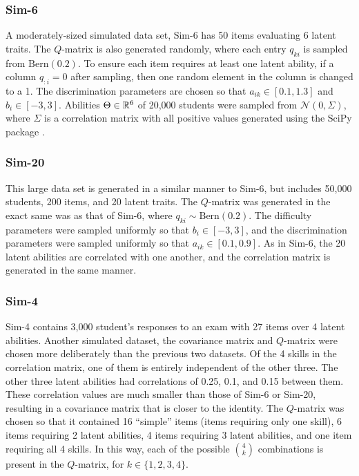 \subsubsection*{Sim-6} A moderately-sized simulated data set, Sim-6 has 50 items evaluating 6 latent traits. The $Q$-matrix is also generated randomly, where each entry $q_{ki}$ is sampled from $\text{Bern}(0.2)$. To ensure each item requires at least one latent ability, if a column $q_{:i} = 0$ after sampling, then one random element in the column is changed to a 1. The discrimination parameters are chosen so that $a_{ik} \in [0.1, 1.3]$ and $b_i \in[-3,3]$. Abilities $\Theta \in \mathbb{R}^6$ of 20,000 students were sampled from $\mathcal{N}(0, \Sigma)$, where $\Sigma$ is a correlation matrix with all positive values generated using the SciPy package \cite{SciPy}.

\subsubsection*{Sim-20} This large data set is generated in a similar manner to Sim-6, but includes 50,000 students, 200 items, and 20 latent traits. The $Q$-matrix was generated in the exact same was as that of Sim-6, where $q_{ki} \sim \text{Bern}(0.2)$. The difficulty parameters were sampled uniformly so that $b_i \in [-3,3]$, and the discrimination parameters were sampled uniformly so that $a_{ik} \in [0.1, 0.9]$. As in Sim-6, the 20 latent abilities are correlated with one another, and the correlation matrix is generated in the same manner.
\subsubsection*{Sim-4} Sim-4 contains 3,000 student's responses to an exam with 27 items over 4 latent abilities. Another simulated dataset, the covariance matrix and $Q$-matrix were chosen more deliberately than the previous two datasets. Of the 4 skills in the correlation matrix, one of them is entirely independent of the other three. The other three latent abilities had correlations of 0.25, 0.1, and 0.15 between them. These correlation values are much smaller than those of Sim-6 or Sim-20, resulting in a covariance matrix that is closer to the identity. The $Q$-matrix was chosen so that it contained 16 ``simple'' items (items requiring only one skill), 6 items requiring 2 latent abilities, 4 items requiring 3 latent abilities, and one item requiring all 4 skills. In this way, each of the possible $\binom{4}{k}$ combinations is present in the $Q$-matrix, for $k\in \{1,2,3,4\}$.

